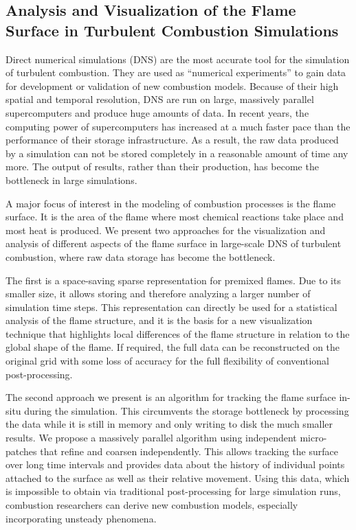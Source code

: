 \subsection{Analysis and Visualization of the Flame Surface in Turbulent
Combustion Simulations} %
\label{sub:contr_flame_vis}
%
Direct numerical simulations (\acs{DNS}) are the most accurate tool
for the simulation of turbulent combustion.
%
They are used as ``numerical experiments'' to gain data for development or
validation of new combustion models.
%
Because of their high spatial and temporal resolution, \ac{DNS} are run on
large, massively parallel supercomputers and produce huge amounts of data.
%
In recent years, the computing power of supercomputers has increased at a much
faster pace than the performance of their storage infrastructure.
%
As a result, the raw data produced by a simulation can not be stored completely
in a reasonable amount of time any more.
%
The output of results, rather than their production, has become the bottleneck
in large simulations.
%

%
A major focus of interest in the modeling of combustion processes is the flame
surface.
%
It is the area of the flame where most chemical reactions take place and most
heat is produced.
%
We present two approaches for the visualization and analysis of different
aspects of the flame surface in large-scale \ac{DNS} of turbulent combustion,
where raw data storage has become the bottleneck.
%

%
The first is a space-saving sparse representation for premixed flames.
%
Due to its smaller size, it allows storing and therefore analyzing a larger
number of simulation time steps.
%
This representation can directly be used for a statistical analysis of the flame
structure, and it is the basis for a new visualization technique that highlights
local differences of the flame structure in relation to the global shape of the
flame.
%
If required, the full data can be reconstructed on the original grid with some
loss of accuracy for the full flexibility of conventional post-processing.
%

%
The second approach we present is an algorithm for tracking the flame surface
in-situ during the simulation.
%
This circumvents the storage bottleneck by processing the data while it is still
in memory and only writing to disk the much smaller results.
%
We propose a massively parallel algorithm using independent micro-patches that
refine and coarsen independently.
%
This allows tracking the surface over long time intervals and provides data
about the history of individual points attached to the surface as well as their
relative movement.
%
Using this data, which is impossible to obtain via traditional post-processing
for large simulation runs, combustion researchers can derive new combustion
models, especially incorporating unsteady phenomena.
%
%
